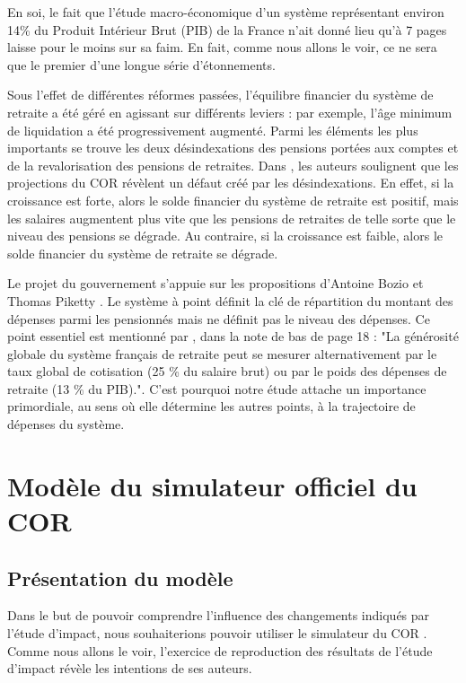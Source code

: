 \documentclass[10pt]{article}
\begin{document}
En soi, le fait que l'étude macro-économique d'un système représentant environ 14\% 
du Produit Intérieur Brut (PIB) de la France n'ait donné lieu qu'à 7 pages laisse pour le 
moins sur sa faim. 
En fait, comme nous allons le voir, ce ne sera que le premier d'une longue 
série d'étonnements. 

Sous l'effet de différentes réformes passées, l'équilibre financier du système 
de retraite a été géré en agissant sur différents 
leviers : par exemple, l'âge minimum de liquidation a été progressivement augmenté. 
Parmi les éléments les plus importants se trouve les deux désindexations 
des pensions portées aux comptes et de la revalorisation des pensions de retraites. 
Dans \cite{Gannon2019}, les auteurs soulignent que les 
projections du COR révèlent un défaut créé par les désindexations. 
En effet, si la croissance est forte, alors le solde financier 
du système de retraite est positif, mais les salaires augmentent plus vite que 
les pensions de retraites de telle sorte que le niveau des pensions se dégrade. 
Au contraire, si la croissance est faible, alors le solde financier du système 
de retraite se dégrade. 

Le projet du gouvernement s'appuie sur les propositions d'Antoine 
Bozio et Thomas Piketty \cite{Bozio2008}. 
Le système à point définit la clé de répartition du montant des dépenses 
parmi les pensionnés mais ne définit pas le niveau des dépenses. 
Ce point essentiel est mentionné par \cite{Bozio2008}, dans la note de 
bas de page 18 : "La générosité globale du système français de retraite 
peut se mesurer alternativement par le taux global de cotisation (25 \% du salaire brut) 
ou par le poids des dépenses de retraite (13 \% du PIB).". 
C'est pourquoi notre étude attache un importance primordiale, au sens où elle 
détermine les autres points, à la trajectoire de dépenses du système. 


\section{Modèle du simulateur officiel du COR}

\subsection{Présentation du modèle}

Dans le but de pouvoir comprendre l'influence des changements indiqués par 
l'étude d'impact, nous souhaiterions pouvoir utiliser le simulateur du COR 
\cite{SimulateurCOR}. 
Comme nous allons le voir, l'exercice de reproduction des résultats 
de l'étude d'impact révèle les intentions de ses auteurs. 
\end{document}
